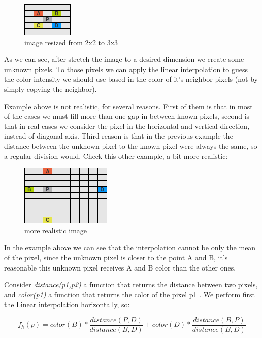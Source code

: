 \documentclass{article}
\begin{document}
	\begin{figure} [H]
		\centering
		\includegraphics[scale=1]{images/bilinear_interpolation_2}
		\caption{image resized from 2x2 to 3x3 \label{bilinear2}}
	\end{figure}

	As we can see, after stretch the image to a desired dimension we create some unknown pixels. To those pixels we can apply the linear interpolation 
	to guess the color intensity we should use based in the color of it's neighbor pixels (not by simply copying the neighbor).

	Example above is not realistic, for several reasons. First of them is that in most of the cases we must fill more than one gap in between known pixels,
	second is that in real cases we consider the pixel in the horizontal and vertical direction, instead of diagonal axis. Third reason is that in the 
	previous example the distance between the unknown pixel to the known pixel were always the same, so a regular division would. 
	Check this other example, a bit more realistic:
	
	\begin{figure} [H]
		\centering
		\includegraphics[scale=1]{images/bilinear_interpolation_3}
		\caption{more realistic image\label{bilinear3}}
	\end{figure}
	
	In the example above we can see that the interpolation cannot be only the mean of the pixel, since the unknown pixel 
	is closer to the point A and B, it's reasonable 
	this unknown pixel receives A and B color than the other ones.

	Consider \textit{distance(p1,p2)} a function that returns the distance between two pixels, 
	and \textit{color(p1)} a function that returns the color of the pixel p1 . We perform first the Linear interpolation horizontally, so:

	\[ f_h(p)=color(B)*\frac{distance(P,D)}{distance(B,D)}+color(D)*\frac{distance(B,P)}{distance(B,D)}  \]
\end{document}
